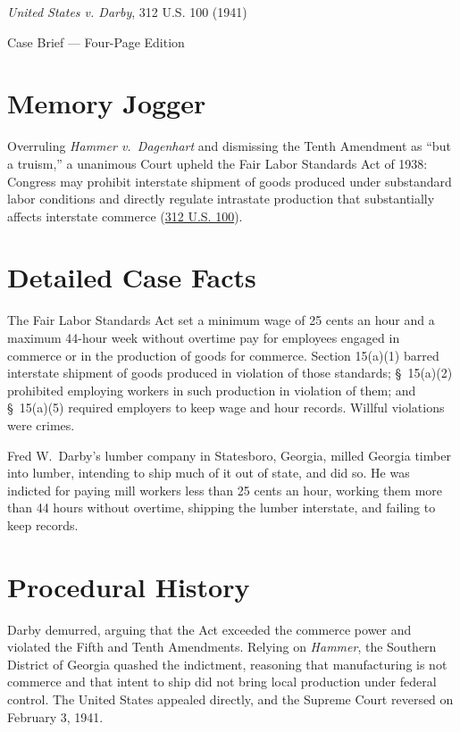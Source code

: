 \documentclass[12pt]{article}
\begin{document}
\begin{center}
{\LARGE \textit{United States v. Darby}, 312 U.S. 100 (1941)\par}
\vspace{0.8em}
{\large Case Brief --- Four-Page Edition\par}
\end{center}
\vspace{1em}

\section{Memory Jogger}

Overruling \textit{Hammer v.\ Dagenhart} and dismissing the Tenth Amendment as ``but a truism,'' a unanimous Court upheld the Fair Labor Standards Act of 1938: Congress may prohibit interstate shipment of goods produced under substandard labor conditions and directly regulate intrastate production that substantially affects interstate commerce (\href{https://supreme.justia.com/cases/federal/us/312/100/}{312 U.S. 100}).

\section{Detailed Case Facts}

The Fair Labor Standards Act set a minimum wage of 25 cents an hour and a maximum 44-hour week without overtime pay for employees engaged in commerce or in the production of goods for commerce. Section 15(a)(1) barred interstate shipment of goods produced in violation of those standards; \S~15(a)(2) prohibited employing workers in such production in violation of them; and \S~15(a)(5) required employers to keep wage and hour records. Willful violations were crimes.

Fred W.\ Darby's lumber company in Statesboro, Georgia, milled Georgia timber into lumber, intending to ship much of it out of state, and did so. He was indicted for paying mill workers less than 25 cents an hour, working them more than 44 hours without overtime, shipping the lumber interstate, and failing to keep records.

\section{Procedural History}

Darby demurred, arguing that the Act exceeded the commerce power and violated the Fifth and Tenth Amendments. Relying on \textit{Hammer}, the Southern District of Georgia quashed the indictment, reasoning that manufacturing is not commerce and that intent to ship did not bring local production under federal control. The United States appealed directly, and the Supreme Court reversed on February 3, 1941.
\end{document}
